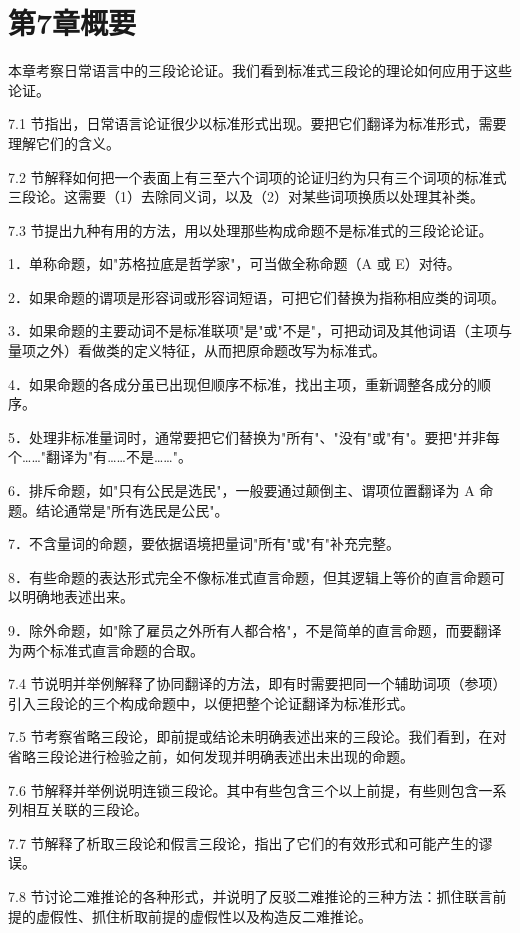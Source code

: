 \section{第7章概要}
本章考察日常语言中的三段论论证。我们看到标准式三段论的理论如何应用于这些论证。

7.1 节指出，日常语言论证很少以标准形式出现。要把它们翻译为标准形式，需要理解它们的含义。

7.2 节解释如何把一个表面上有三至六个词项的论证归约为只有三个词项的标准式三段论。这需要（1）去除同义词，以及（2）对某些词项换质以处理其补类。

7.3 节提出九种有用的方法，用以处理那些构成命题不是标准式的三段论论证。

1．单称命题，如"苏格拉底是哲学家"，可当做全称命题（A 或 E）对待。

2．如果命题的谓项是形容词或形容词短语，可把它们替换为指称相应类的词项。

3．如果命题的主要动词不是标准联项"是"或"不是"，可把动词及其他词语（主项与量项之外）看做类的定义特征，从而把原命题改写为标准式。

4．如果命题的各成分虽已出现但顺序不标准，找出主项，重新调整各成分的顺序。

5．处理非标准量词时，通常要把它们替换为"所有"、"没有"或"有"。要把"并非每个……"翻译为"有……不是……"。

6．排斥命题，如"只有公民是选民"，一般要通过颠倒主、谓项位置翻译为 A 命题。结论通常是"所有选民是公民"。

7．不含量词的命题，要依据语境把量词"所有"或"有"补充完整。

8．有些命题的表达形式完全不像标准式直言命题，但其逻辑上等价的直言命题可以明确地表述出来。

9．除外命题，如"除了雇员之外所有人都合格"，不是简单的直言命题，而要翻译为两个标准式直言命题的合取。

7.4 节说明并举例解释了协同翻译的方法，即有时需要把同一个辅助词项（参项）引入三段论的三个构成命题中，以便把整个论证翻译为标准形式。

7.5 节考察省略三段论，即前提或结论未明确表述出来的三段论。我们看到，在对省略三段论进行检验之前，如何发现并明确表述出未出现的命题。

7.6 节解释并举例说明连锁三段论。其中有些包含三个以上前提，有些则包含一系列相互关联的三段论。

7.7 节解释了析取三段论和假言三段论，指出了它们的有效形式和可能产生的谬误。

7.8 节讨论二难推论的各种形式，并说明了反驳二难推论的三种方法：抓住联言前提的虚假性、抓住析取前提的虚假性以及构造反二难推论。 